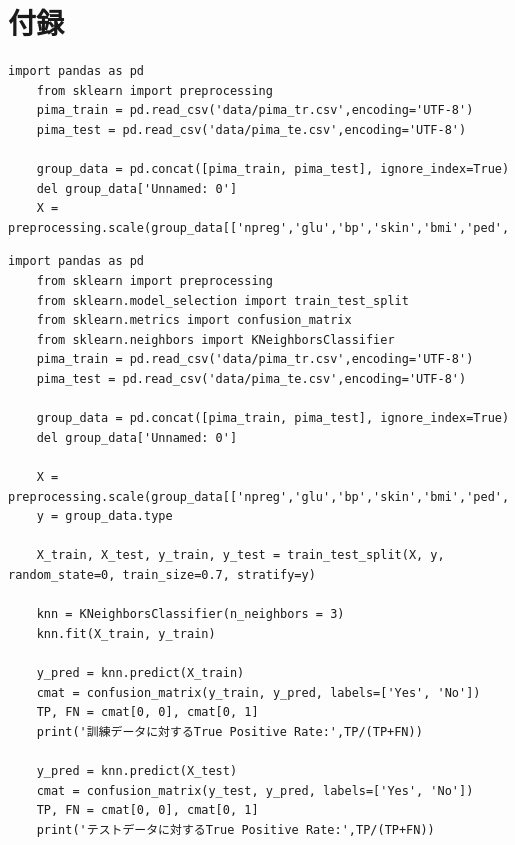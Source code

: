 \documentclass[12pt]{jarticle}
\begin{document}
\clearpage
\appendix
\section{付録}
\begin{lstlisting}[style = py,caption=授業内課題(1)]
    import pandas as pd
    from sklearn import preprocessing
    pima_train = pd.read_csv('data/pima_tr.csv',encoding='UTF-8')
    pima_test = pd.read_csv('data/pima_te.csv',encoding='UTF-8')
    
    group_data = pd.concat([pima_train, pima_test], ignore_index=True)
    del group_data['Unnamed: 0']
    X = preprocessing.scale(group_data[['npreg','glu','bp','skin','bmi','ped','age']])
\end{lstlisting}


\begin{lstlisting}[style = py,caption=授業内課題(2)]
    import pandas as pd
    from sklearn import preprocessing
    from sklearn.model_selection import train_test_split
    from sklearn.metrics import confusion_matrix
    from sklearn.neighbors import KNeighborsClassifier
    pima_train = pd.read_csv('data/pima_tr.csv',encoding='UTF-8')
    pima_test = pd.read_csv('data/pima_te.csv',encoding='UTF-8')
    
    group_data = pd.concat([pima_train, pima_test], ignore_index=True)
    del group_data['Unnamed: 0']
    
    X = preprocessing.scale(group_data[['npreg','glu','bp','skin','bmi','ped','age']])
    y = group_data.type
    
    X_train, X_test, y_train, y_test = train_test_split(X, y, random_state=0, train_size=0.7, stratify=y)
    
    knn = KNeighborsClassifier(n_neighbors = 3)
    knn.fit(X_train, y_train)
    
    y_pred = knn.predict(X_train)
    cmat = confusion_matrix(y_train, y_pred, labels=['Yes', 'No'])
    TP, FN = cmat[0, 0], cmat[0, 1]
    print('訓練データに対するTrue Positive Rate:',TP/(TP+FN))
    
    y_pred = knn.predict(X_test)
    cmat = confusion_matrix(y_test, y_pred, labels=['Yes', 'No'])
    TP, FN = cmat[0, 0], cmat[0, 1]
    print('テストデータに対するTrue Positive Rate:',TP/(TP+FN))
\end{lstlisting}
\end{document}
